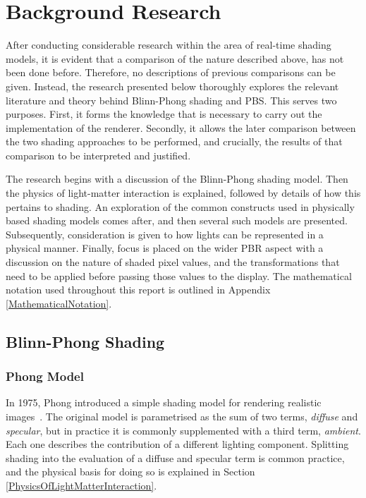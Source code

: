 \section{Background Research}

After conducting considerable research within the area of real-time shading models, it is evident that a comparison of the nature described above, has not been done before. Therefore, no descriptions of previous comparisons can be given. Instead, the research presented below thoroughly explores the relevant literature and theory behind Blinn-Phong shading and PBS. This serves two purposes. First, it forms the knowledge that is necessary to carry out the implementation of the renderer. Secondly, it allows the later comparison between the two shading approaches to be performed, and crucially, the results of that comparison to be interpreted and justified.

The research begins with a discussion of the Blinn-Phong shading model. Then the physics of light-matter interaction is explained, followed by details of how this pertains to shading. An exploration of the common constructs used in physically based shading models comes after, and then several such models are presented. Subsequently, consideration is given to how lights can be represented in a physical manner. Finally, focus is placed on the wider PBR aspect with a discussion on the nature of shaded pixel values, and the transformations that need to be applied before passing those values to the display. The mathematical notation used throughout this report is outlined in Appendix \ref{MathematicalNotation}.

\subsection{Blinn-Phong Shading} \label{BlinnPhongShading}

\subsubsection{Phong Model}

In 1975, Phong introduced a simple shading model for rendering realistic images~\cite{PhongShading}. The original model is parametrised as the sum of two terms, \textit{diffuse} and \textit{specular}, but in practice it is commonly supplemented with a third term, \textit{ambient}. Each one describes the contribution of a different lighting component. Splitting shading into the evaluation of a diffuse and specular term is common practice, and the physical basis for doing so is explained in Section \ref{PhysicsOfLightMatterInteraction}.

